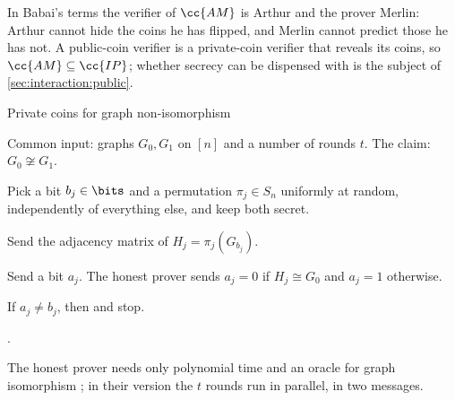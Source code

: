 \begin{refsection}
In Babai's terms the verifier of $\cc{AM}$ is Arthur and the prover Merlin: Arthur cannot hide the coins he has flipped, and Merlin cannot predict those he has not. A public-coin verifier is a private-coin verifier that reveals its coins, so $\cc{AM}\subseteq\cc{IP}$; whether secrecy can be dispensed with is the subject of \cref{sec:interaction:public}.

\begin{protocol}{Private coins for graph non-isomorphism}\label{prot:interaction:gni}
\item[\act{V}] Common input: graphs $G_0,G_1$ on $[n]$ and a number of rounds $t$. The claim: $G_0\not\cong G_1$.
\item[\act{V}] Pick a bit $b_j\in\bits$ and a permutation $\pi_j\in S_n$ uniformly at random, independently of everything else, and keep both secret.
\item[\msg{V}{P}] Send the adjacency matrix of $H_j=\pi_j(G_{b_j})$.
\item[\msg{P}{V}] Send a bit $a_j$. The honest prover sends $a_j=0$ if $H_j\cong G_0$ and $a_j=1$ otherwise.
\item[\act{V}] If $a_j\ne b_j$, then \rej{} and stop.
\item[\act{V}] \acc.
\end{protocol}

The honest prover needs only polynomial time and an oracle for graph isomorphism \parencite{GoldreichMicaliWigderson1991}; in their version the $t$ rounds run in parallel, in two messages.


\end{refsection}
